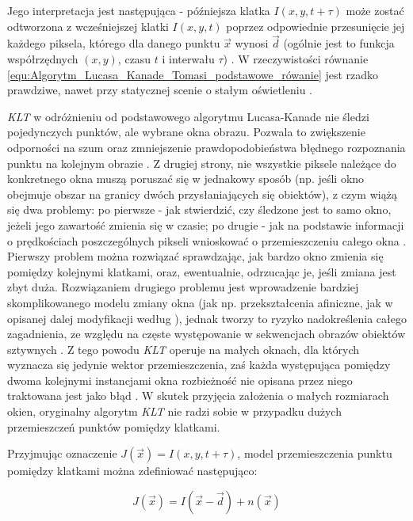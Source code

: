 Jego interpretacja jest następująca - późniejsza klatka $I(x, y, t + \tau)$ może zostać odtworzona z wcześniejszej klatki $I(x, y, t)$ poprzez odpowiednie przesunięcie jej każdego piksela, którego dla danego punktu $\vec{x}$ wynosi $\vec{d}$ (ogólnie jest to funkcja współrzędnych $(x, y)$, czasu $t$ i interwału $\tau$) \cite{Tomasi1991}. W rzeczywistości równanie \ref{equ:Algorytm_Lucasa_Kanade_Tomasi_podstawowe_rówanie} jest rzadko prawdziwe, nawet przy statycznej scenie o stałym oświetleniu \cite{Tomasi1991}.

\textit{KLT} w odróżnieniu od podstawowego algorytmu Lucasa-Kanade nie śledzi pojedynczych punktów, ale wybrane okna obrazu. Pozwala to zwiększenie odporności na szum oraz zmniejszenie prawdopodobieństwa błędnego rozpoznania punktu na kolejnym obrazie \cite{Tomasi1991}. Z drugiej strony, nie wszystkie piksele należące do konkretnego okna muszą poruszać się w jednakowy sposób (np. jeśli  okno obejmuje obszar na granicy dwóch przysłaniających się obiektów), z czym wiążą się dwa problemy: po pierwsze - jak stwierdzić, czy śledzone jest to samo okno, jeżeli jego zawartość zmienia się w czasie; po drugie - jak na podstawie informacji o prędkościach poszczególnych pikseli wnioskować o przemieszczeniu całego okna \cite{Tomasi1991}. Pierwszy problem można rozwiązać sprawdzając, jak bardzo okno zmienia się pomiędzy kolejnymi klatkami, oraz, ewentualnie, odrzucając je, jeśli zmiana jest zbyt duża. Rozwiązaniem drugiego problemu jest wprowadzenie bardziej skomplikowanego modelu zmiany okna (jak np. przekształcenia afiniczne, jak w opisanej dalej modyfikacji według \cite{Shi1994}), jednak tworzy to ryzyko nadokreślenia całego zagadnienia, ze względu na częste występowanie w sekwencjach obrazów obiektów sztywnych \cite{Tomasi1991}. Z tego powodu \textit{KLT} operuje na małych oknach, dla których wyznacza się jedynie wektor przemieszczenia, zaś każda występująca pomiędzy dwoma kolejnymi instancjami okna rozbieżność nie opisana przez niego traktowana jest jako błąd \cite{Tomasi1991}. W skutek przyjęcia założenia o małych rozmiarach okien, oryginalny algorytm \textit{KLT} nie radzi sobie w przypadku dużych przemieszczeń punktów pomiędzy klatkami.  

Przyjmując oznaczenie  $J(\vec{x}) = I(x, y, t + \tau)$, model przemieszczenia punktu pomiędzy klatkami można zdefiniować następująco:

\begin{equation}
\label{equ:Algorytm_Lucasa_Kanade_Tomasi_model}
	J(\vec{x}) = I(\vec{x} - \vec{d}) + n(\vec{x})
\end{equation}

